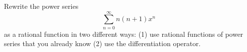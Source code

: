 Rewrite the power series
\[
\sum_{n=0}^\infty n(n+1) x^n
\]
as a rational function in two different ways:
(1) use rational functions of power series that you already know
(2) use the differentiation operator.
